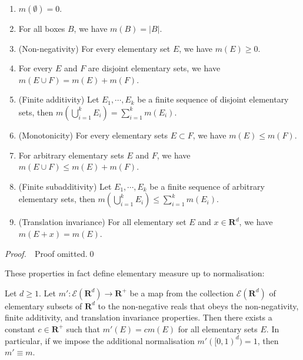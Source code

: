 \documentclass{book}
\theoremstyle{defstyle}
\theoremstyle{thmstyle}
\newcommand{\pff}{\noindent\emph{Proof.}~~}
\newcommand{\newa}{\vspace{1em}\indent}
\begin{document}
\begin{proposition}\label{thm:the properties of elementary measure}
    \qquad

    \begin{enumerate}
        \item $m(\emptyset) = 0$.
        \item For all boxes $B$, we have $m(B) = |B|$.
        \item (Non-negativity) For every elementary set $E$, we have $m(E) \geq 0$.
        \item For every $E$ and $F$ are disjoint elementary sets, we have $m(E \cup F) = m(E) + m(F)$.
        \item (Finite additivity) Let $E_1, \cdots, E_k$ be a finite sequence of disjoint elementary sets, then $m(\bigcup_{i = 1}^{k}E_i) = \sum_{i = 1}^{k} m(E_i)$.
        \item (Monotonicity) For every elementary sets $E \subset F$, we have $m(E) \leq m(F)$.
        \item For arbitrary elementary sets $E$ and $F$, we have $m(E \cup F) \leq m(E) + m(F)$.
        \item (Finite subadditivity) Let $E_1, \cdots, E_k$ be a finite sequence of arbitrary elementary sets, then $m(\bigcup_{i = 1}^{k}E_i) \leq \sum_{i = 1}^{k} m(E_i)$.
        \item (Translation invariance) For all elementary set $E$ and $x \in \mathbf{R}^d$, we have $m(E + x) = m(E)$.
    \end{enumerate}
\end{proposition}

\pff Proof omitted.\qed

\newa These properties in fact define elementary measure up to normalisation:

\begin{theorem}\label{thm:uniqueness of elementary measure}
    Let $d \geq 1$. Let $m' : \mathcal{E}(\mathbf{R}^d) \to \mathbf{R}^+$ be a map from the collection $\mathcal{E}(\mathbf{R}^d)$ of elementary subsets of $\mathbf{R}^d$ to the non-negative reals that obeys the non-negativity, finite additivity, and translation invariance properties. Then there exists a constant $c \in \mathbf{R}^+$ such that $m'(E) = cm(E)$ for all elementary sets $E$. In particular, if we impose the additional normalisation $m'([0, 1)^d) = 1$, then $m' \equiv m$.
\end{theorem}
\end{document}
